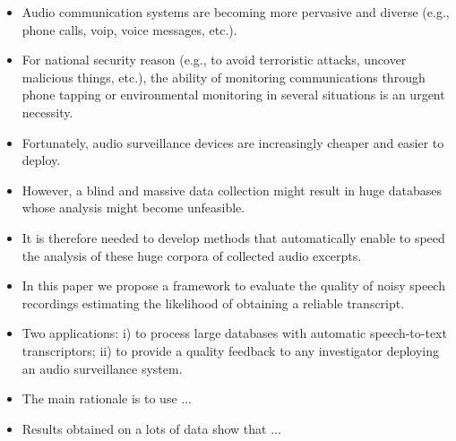 \begin{itemize}


	\item Audio communication systems are becoming more pervasive and diverse (e.g., phone calls, voip, voice messages, etc.).
	
	\item For national security reason (e.g., to avoid terroristic attacks, uncover malicious things, etc.), the ability of monitoring communications through phone tapping or environmental monitoring in several situations is an urgent necessity.
	
	\item Fortunately, audio surveillance devices are increasingly cheaper and easier to deploy.
	\item However, a blind and massive data collection might result in huge databases whose analysis might become unfeasible.
	\item It is therefore needed to develop methods that automatically enable to speed the analysis of these huge corpora of collected audio excerpts.
	\item In this paper we propose a framework to evaluate the quality of noisy speech recordings estimating the likelihood of obtaining a reliable transcript.
	\item Two applications: i) to process large databases with automatic speech-to-text transcriptors; ii) to provide a quality feedback to any investigator deploying an audio surveillance system.
	\item The main rationale is to use ...
	\item Results obtained on a lots of data show that ...
\end{itemize}


\cite{Piva2013}
